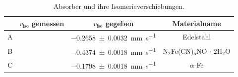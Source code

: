 \begin{table}[ht]
	\centering
	\caption{Absorber und ihre Isomerieverschiebungen.} 
	\label{tab:isoVgl}
	\begin{tabular}{c|ccc}
		\toprule
		  &   $v_\text{iso}$ gemessen    &            $v_\text{iso}$ gegeben             &           Materialname            \\ \midrule
		A &  & \SI{-0.2658+-0.0032}{\milli\meter\per\second} &             Edelstahl             \\
		B &  & \SI{-0.4374+-0.0018}{\milli\meter\per\second} & N$_2$Fe(CN)$_5$NO $\cdot$ 2H$_2$O \\
		C &  & \SI{-0.1798+-0.0018}{\milli\meter\per\second} &             $\alpha$-Fe              \\ \bottomrule
	\end{tabular}
\end{table}

 